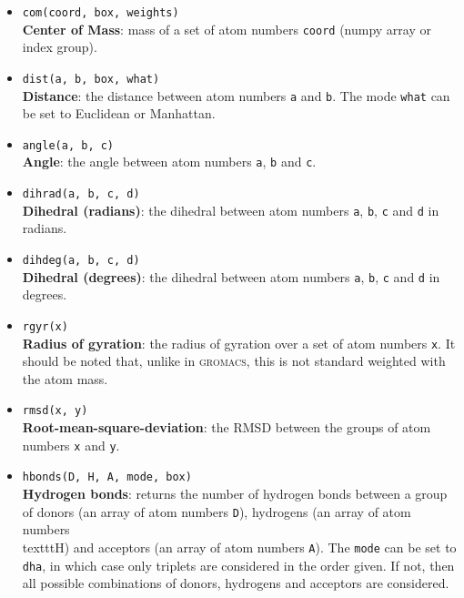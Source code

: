 \documentclass[]{article}
\begin{document}
\begin{itemize}
\item 	\texttt{com(coord, box, weights)}\\
		\textbf{Center of Mass}: mass of a set of atom numbers \texttt{coord} (numpy array or index group).
\item 	\texttt{dist(a, b, box, what)}\\
		\textbf{Distance}: the distance between atom numbers \texttt{a} and \texttt{b}. The mode \texttt{what} can be set to Euclidean or Manhattan.
\item 	\texttt{angle(a, b, c)}\\
		\textbf{Angle}: the angle between atom numbers \texttt{a}, \texttt{b} and \texttt{c}.
\item 	\texttt{dihrad(a, b, c, d)}\\
		\textbf{Dihedral (radians)}: the dihedral between atom numbers \texttt{a}, \texttt{b}, \texttt{c} and \texttt{d} in radians.
\item 	\texttt{dihdeg(a, b, c, d)}\\
		\textbf{Dihedral (degrees)}: the dihedral between atom numbers \texttt{a}, \texttt{b}, \texttt{c} and \texttt{d} in degrees.
\item 	\texttt{rgyr(x)}\\
		\textbf{Radius of gyration}: the radius of gyration over a set of atom numbers \texttt{x}.
		It should be noted that, unlike in \textsc{gromacs}, this is not standard weighted with the atom mass.
\item 	\texttt{rmsd(x, y)}\\
		\textbf{Root-mean-square-deviation}: the RMSD between the groups of atom numbers \texttt{x} and \texttt{y}.
\item 	\texttt{hbonds(D, H, A, mode, box)}\\
		\textbf{Hydrogen bonds}: returns the number of hydrogen bonds between a group of donors (an array of atom numbers \texttt{D}), hydrogens (an array of atom numbers \\texttt{H}) and acceptors (an array of atom numbers \texttt{A}). The \texttt{mode} can be set to \texttt{dha}, in which case only triplets are considered in the order given. If not, then all possible combinations of donors, hydrogens and acceptors are considered. 
\end{itemize}
\end{document}

